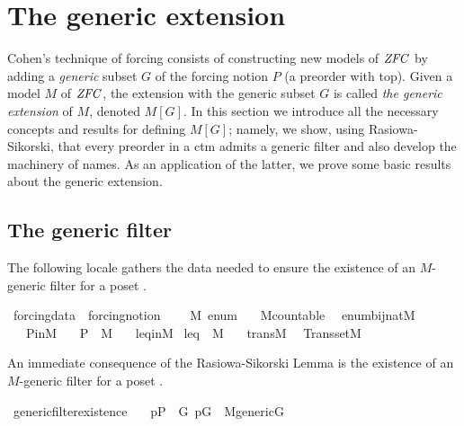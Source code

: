 \section{The generic extension}

Cohen's technique of forcing consists of constructing new models of
$\mathit{ZFC}$ by adding a \emph{generic} subset $G$ of the forcing notion $P$
(a preorder with top). Given a model $M$ of $\mathit{ZFC}$, the extension with
the generic subset $G$ is called \emph{the generic extension} of $M$,
denoted $M[G]$.  In this section we introduce all the necessary
concepts and results for defining $M[G]$; namely, we show, using
Rasiowa-Sikorski, that every preorder in a ctm admits a generic filter
and also develop the machinery of names. As an application of the
latter, we prove some basic
results about the generic extension.

\subsection{The generic filter}
\label{sec:generic-filter}
The following locale gathers the data needed to ensure the 
existence of an $M$-generic filter for a poset . 

\begin{isabelle}
\isamarkupfalse%
\ forcing{\isacharunderscore}data\ {\isacharequal}\ forcing{\isacharunderscore}notion\ {\isacharplus}\isanewline
\ \ \ M\ enum\isanewline
\ \ \ M{\isacharunderscore}countable{\isacharcolon} \ \ {\isachardoublequoteopen}enum{\isasymin}bij{\isacharparenleft}nat{\isacharcomma}M{\isacharparenright}{\isachardoublequoteclose}\isanewline
 \ \ \ P{\isacharunderscore}in{\isacharunderscore}M{\isacharcolon}  \ \ \ {\isachardoublequoteopen}P\ {\isasymin}\ M{\isachardoublequoteclose}\isanewline
 \ \ \ leq{\isacharunderscore}in{\isacharunderscore}M{\isacharcolon}  \ {\isachardoublequoteopen}leq\ {\isasymin}\ M{\isachardoublequoteclose}\isanewline
 \ \ \ trans{\isacharunderscore}M{\isacharcolon}  \ \ {\isachardoublequoteopen}Transset{\isacharparenleft}M{\isacharparenright}{\isachardoublequoteclose}
\end{isabelle}

An immediate consequence of the Rasiowa-Sikorski Lemma is the
existence of an $M$-generic filter for a poset .

\begin{isabelle}

\isamarkupfalse%
\ generic{\isacharunderscore}filter{\isacharunderscore}existence{\isacharcolon}\ \isanewline
\ \ {\isachardoublequoteopen}p{\isasymin}P\ {\isasymLongrightarrow}\ {\isasymexists}G{\isachardot}\ p{\isasymin}G\ {\isasymand}\ M{\isacharunderscore}generic{\isacharparenleft}G{\isacharparenright}{\isachardoublequoteclose}
\end{isabelle}

